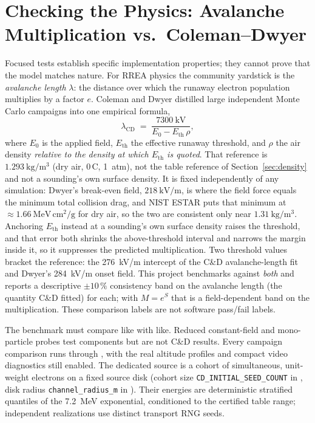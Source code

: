 \documentclass[11pt]{article}
\DeclareRobustCommand{\code}[1]{\ifmmode\text{\ttfamily#1}\else\nolinkurl{#1}\fi}
\begin{document}
\section{Checking the Physics: Avalanche Multiplication vs.\ Coleman--Dwyer}
\label{sec:cdcheck}

Focused tests establish specific implementation properties; they cannot prove
that the model matches nature. For RREA physics the community yardstick is
the \emph{avalanche length} $\lambda$: the distance over which the runaway
electron population multiplies by a factor $e$. Coleman and Dwyer distilled
large independent Monte Carlo campaigns into one empirical formula,
\[
  \lambda_{\mathrm{CD}} \;=\; \frac{7300~\mathrm{kV}}{E_0 -
  E_{\mathrm{th}}\,\rho},
\]
where $E_0$ is the applied field, $E_{\mathrm{th}}$ the effective runaway
threshold, and $\rho$ the air density \emph{relative to the density at which
$E_{\mathrm{th}}$ is quoted}. That reference is
$1.293~\mathrm{kg/m^3}$ (dry air, 0\,\textdegree C, 1~atm), not the table
reference of Section~\ref{sec:density} and not a sounding's own surface
density. It is fixed independently of any simulation: Dwyer's break-even
field, $218~\mathrm{kV/m}$, is where the field force equals the minimum total
collision drag, and NIST ESTAR puts that minimum at
$\approx1.66~\mathrm{MeV\,cm^2/g}$ for dry air, so the two are consistent only
near $1.31~\mathrm{kg/m^3}$. Anchoring $E_{\mathrm{th}}$ instead at a
sounding's own surface density raises the threshold, and that error both
shrinks the above-threshold interval and narrows the margin inside it, so it
suppresses the predicted multiplication.
Two threshold values bracket the reference: the 276~kV/m intercept of the
C\&D avalanche-length fit and Dwyer's 284~kV/m onset field. This project
benchmarks against \emph{both} and reports a descriptive $\pm10\,\%$
consistency band on the avalanche length (the quantity C\&D fitted) for each;
with $M=e^{S}$ that is a field-dependent band on the multiplication.  These comparison labels are not
software pass/fail labels.

The benchmark must compare like with like. Reduced constant-field and
mono-particle probes test components but are not C\&D results. Every campaign
comparison runs through
, with the real altitude
profiles and compact video diagnostics still enabled.  The dedicated source
is a cohort of simultaneous, unit-weight electrons on a fixed source disk
(cohort size \code{CD\_INITIAL\_SEED\_COUNT} in
, disk radius
\code{channel\_radius\_m} in ).
Their energies are deterministic stratified quantiles of the
7.2~MeV exponential, conditioned to the certified table range; independent
realizations use distinct transport RNG seeds.
\end{document}
